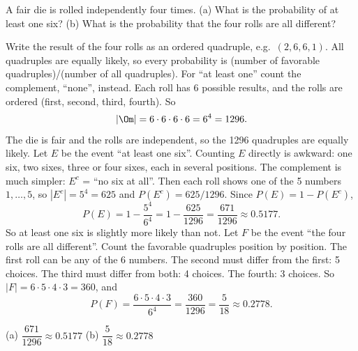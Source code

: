 
\begin{problem}
	A fair die is rolled independently four times. (a) What is the probability of at least one
	six? (b) What is the probability that the four rolls are all different?
\end{problem}

\begin{solution}
	\idea Write the result of the four rolls as an ordered quadruple, e.g.\
	$(2,6,6,1)$. All quadruples are equally likely, so every probability is
	(number of favorable quadruples)/(number of all quadruples). For ``at least
	one'' count the complement, ``none'', instead.
	 Each roll has 6 possible results, and the rolls are
	ordered (first, second, third, fourth). So
	\[ |\Om|=6\cdot6\cdot6\cdot6=6^4=1296. \]
	The die is fair and the rolls are independent, so the 1296
	quadruples are equally likely.
	 Let $E$ be the event ``at least one six''. Counting $E$ directly
	is awkward: one six, two sixes, three or four sixes, each in several
	positions. The complement is much simpler: $E^c$ = ``no six at all''. Then
	each roll shows one of the 5 numbers $1,\dots,5$, so $|E^c|=5^4=625$ and
	$P(E^c)=625/1296$. Since $P(E)=1-P(E^c)$,
	\[ P(E)=1-\frac{5^4}{6^4}=1-\frac{625}{1296}=\frac{671}{1296}\approx0.5177. \]
	So at least one six is slightly more likely than not.
	 Let $F$ be the event ``the four rolls are all different''. Count
	the favorable quadruples position by position. The first roll can be any of
	the 6 numbers. The second must differ from the first: 5 choices. The third
	must differ from both: 4 choices. The fourth: 3 choices. So
	$|F|=6\cdot5\cdot4\cdot3=360$, and
	\[ P(F)=\frac{6\cdot5\cdot4\cdot3}{6^4}=\frac{360}{1296}=\frac{5}{18}\approx0.2778. \]
	\begin{answer}
		(a) $\dfrac{671}{1296}\approx0.5177$ \quad (b) $\dfrac{5}{18}\approx0.2778$
	\end{answer}
\end{solution}
